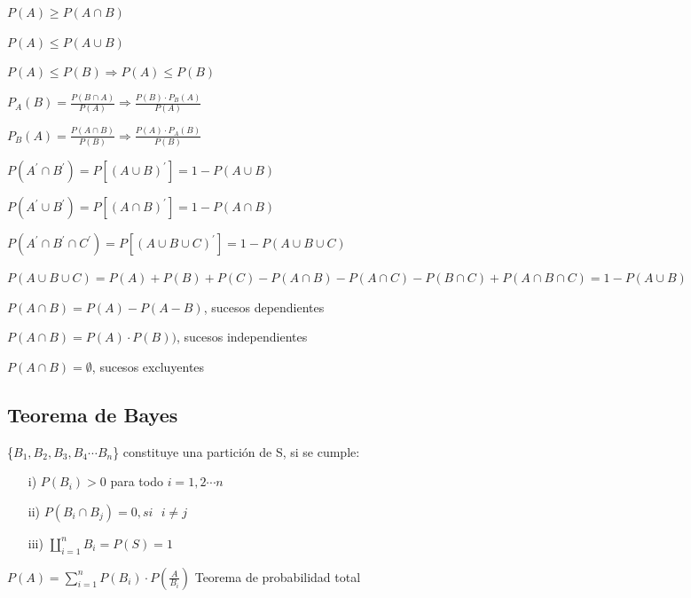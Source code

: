\documentclass[12pt]{report}
\begin{document}
\begin{large}
\begin{center}
$\displaystyle P(A)\geq P(A \cap B)$

$\displaystyle P(A)\leq P(A \cup B)$

$\displaystyle P(A)\leq P(B) \Rightarrow P(A) \leq P(B)$
\linebreak

$\displaystyle P_A(B)=\frac{P(B \cap A)}{P(A)}\Rightarrow \frac{P(B)\cdot P_B(A)}{P(A)}$

$\displaystyle P_B(A)=\frac{P(A\cap B)}{P(B)} \Rightarrow \frac{P(A)\cdot P_A(B)}{P(B)}$
\linebreak

$\displaystyle P(A^\prime \cap B^\prime)=P[(A\cup B)^\prime]=1-P(A\cup B)$

$\displaystyle P(A^\prime \cup B^\prime)=P[(A\cap B)^\prime]=1-P(A\cap B)$
\linebreak

$\displaystyle P(A^\prime \cap B^\prime \cap C^\prime)=P[(A\cup B \cup C)^\prime]=1-P(A\cup B \cup C)$

$\displaystyle P(A\cup B \cup C)=P(A)+P(B)+P(C)-P(A\cap B)-P(A\cap C)-P(B\cap C)+P(A\cap B\cap C)=1-P(A\cup B)$
\linebreak

$\displaystyle P(A\cap B)=P(A)-P(A-B)$, sucesos dependientes

$\displaystyle P(A\cap B)=P(A)\cdot P(B))$, sucesos independientes

$\displaystyle P(A\cap B)=\emptyset$, sucesos excluyentes

\subsection*{Teorema de Bayes}

\{$\displaystyle B_1,B_2,B_3,B_4\cdots B_n$\} constituye una partición de S, si se cumple:

\begin{itemize}

	\item[i)]
	$\displaystyle P(B_i)>0$ para todo $i=1,2\cdots n$
	\item[ii)]
	$\displaystyle P(B_i \cap B_j)=0, si\textbf{ }i\neq j$
	\item[iii)]
	$\displaystyle \amalg_{i=1}^{n}{B_i}=P(S)=1$
\end{itemize}


$\displaystyle P(A)=\sum_{i=1}^{n}{P(B_i)\cdot P\left( \frac{A}{B_i}\right)}$ Teorema de probabilidad total
\linebreak


\end{center}
\end{large}
\end{document}
